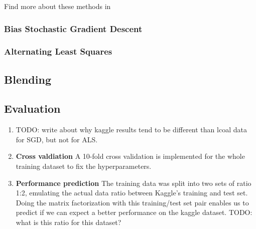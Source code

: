 Find more about these methods in \cite{Aberger2009}

\subsubsection{Bias Stochastic Gradient Descent}



\subsubsection{Alternating Least Squares}



\subsection{Blending}



\subsection{Evaluation}

\begin{enumerate}
  \item TODO: write about why kaggle results tend to be different than lcoal data for
    SGD, but not for ALS.
  \item \textbf{Cross valdiation} A 10-fold cross validation is implemented
    for the whole training dataset to fix the hyperparameters. 

  \item \textbf{Performance prediction} The training data was split into two
    sets of ratio 1:2, emulating the actual data ratio between Kaggle's training
    and test set. Doing the matrix factorization with this training/test set
    pair enables us to predict if we can expect a better performance on the
    kaggle dataset.  
    TODO: what is this ratio for this dataset? 
\end{enumerate}

